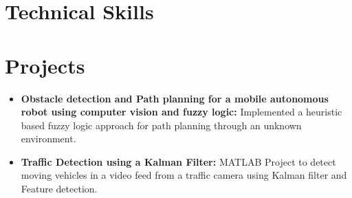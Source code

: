 \documentclass[letter,11pt]{article}
\newcommand{\projectItem}[2]{
  \item \small{
    \textbf{#1: }{#2 \vspace{-2mm}}
  }
}
\newcommand{\resumeSubHeadingListStart}{\begin{itemize}[leftmargin=*]}
\newcommand{\resumeSubHeadingListEnd}{\end{itemize}}
\begin{document}
  \vspace{-6mm}
\section{Technical Skills}
\vspace{-4mm}
\begin{table}[h]
  \centering
  \end{table}

  \vspace{-4mm}
\section{Projects}
  \resumeSubHeadingListStart
    \projectItem{Obstacle detection and Path planning for a mobile autonomous robot using computer vision and fuzzy logic}
      {Implemented a heuristic based fuzzy logic approach for path planning through an unknown environment.}
    \projectItem{Traffic Detection using a Kalman Filter}
      {MATLAB Project to detect moving vehicles in a video feed from a traffic
      camera using Kalman filter and Feature detection.}
  \resumeSubHeadingListEnd


\end{document}
